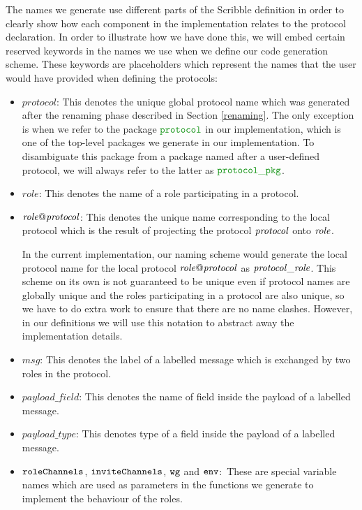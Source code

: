 \documentclass[12pt,twoside]{report}
\begin{document}
The names we generate use different parts of the Scribble definition in order to clearly show how each component in the implementation relates to the protocol declaration. In order to illustrate how we have done this, we will embed certain reserved keywords in the names we use when we define our code generation scheme. These keywords are placeholders which represent the names that the user would have provided when defining the protocols:

\begin{itemize}
    \item $\mathit{protocol}$: This denotes the unique global protocol name which was generated after the renaming phase described in Section \ref{renaming}. The only exception is when we refer to the package $\pkgname{protocol}$ in our implementation, which is one of the top-level packages we generate in our implementation. To disambiguate this package from a package named after a user-defined protocol, we will always refer to the latter as $\pkgname{protocol\_pkg}$.

    \item $\mathit{role}$: This denotes the name of a role participating in a protocol.

    \item $\mathit{\localprotocol{role}{protocol}}$: This denotes the unique name corresponding to the local protocol which is the result of projecting the protocol $\protocolname{protocol}$ onto $\rolename{role}$.
    
    In the current implementation, our naming scheme would generate the local protocol name for the local protocol $\mathit{\localprotocol{role}{protocol}}$ as $\localprotocolname{role}{protocol}$. This scheme on its own is not guaranteed to be unique even if protocol names are globally unique and the roles participating in a protocol are also unique, so we have to do extra work to ensure that there are no name clashes. However, in our definitions we will use this notation to abstract away the implementation details.

    \item $\mathit{msg}$: This denotes the label of a labelled message which is exchanged by two roles in the protocol.
    
    \item $\mathit{payload\_field}$: This denotes the name of field inside the payload of a labelled message.
    
    \item $\mathit{payload\_type}$: This denotes type of a field inside the payload of a labelled message.
    \item $\varname{roleChannels}$, $\varname{inviteChannels}$, $\varname{wg}$ and $\varname{env}$:\, These are special variable names which are used as parameters in the functions we generate to implement the behaviour of the roles.
\end{itemize}
\end{document}

